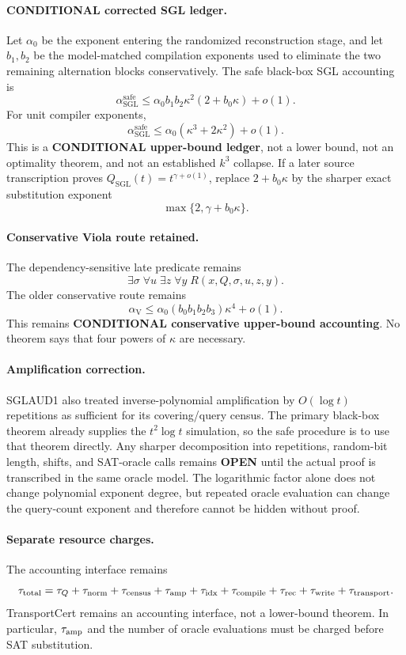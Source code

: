 \documentclass[11pt]{article}
\begin{document}
\paragraph{CONDITIONAL corrected SGL ledger.}
Let \(\alpha_0\) be the exponent entering the randomized reconstruction stage, and let \(b_1,b_2\) be the model-matched compilation exponents used to eliminate the two remaining alternation blocks conservatively. The safe black-box SGL accounting is
\[
\boxed{
\alpha_{\mathrm{SGL}}^{\mathrm{safe}}
\le
\alpha_0 b_1b_2\kappa^2(2+b_0\kappa)+o(1).
}
\]
For unit compiler exponents,
\[
\boxed{
\alpha_{\mathrm{SGL}}^{\mathrm{safe}}
\le
\alpha_0(\kappa^3+2\kappa^2)+o(1).
}
\]
This is a \textbf{CONDITIONAL upper-bound ledger}, not a lower bound, not an optimality theorem, and not an established \(k^3\) collapse. If a later source transcription proves \(Q_{\mathrm{SGL}}(t)=t^{\gamma+o(1)}\), replace \(2+b_0\kappa\) by the sharper exact substitution exponent
\[
\boxed{\max\{2,\gamma+b_0\kappa\}.}
\]

\paragraph{Conservative Viola route retained.}
The dependency-sensitive late predicate remains
\[
\boxed{
\exists\sigma\;\forall u\;\exists z\;\forall y\;R(x,Q,\sigma,u,z,y).
}
\]
The older conservative route remains
\[
\boxed{
\alpha_{\mathrm V}
\le
\alpha_0(b_0b_1b_2b_3)\kappa^4+o(1).
}
\]
This remains \textbf{CONDITIONAL conservative upper-bound accounting}. No theorem says that four powers of \(\kappa\) are necessary.

\paragraph{Amplification correction.}
SGLAUD1 also treated inverse-polynomial amplification by \(O(\log t)\) repetitions as sufficient for its covering/query census. The primary black-box theorem already supplies the \(t^2\log t\) simulation, so the safe procedure is to use that theorem directly. Any sharper decomposition into repetitions, random-bit length, shifts, and SAT-oracle calls remains \textbf{OPEN} until the actual proof is transcribed in the same oracle model. The logarithmic factor alone does not change polynomial exponent degree, but repeated oracle evaluation can change the query-count exponent and therefore cannot be hidden without proof.

\paragraph{Separate resource charges.}
The accounting interface remains
\[
\tau_{\rm total}=
\tau_Q+\tau_{\rm norm}+\tau_{\rm census}+\tau_{\rm amp}
+\tau_{\rm idx}+\tau_{\rm compile}+\tau_{\rm rec}
+\tau_{\rm write}+\tau_{\rm transport}.
\]
TransportCert remains an accounting interface, not a lower-bound theorem. In particular, \(\tau_{\rm amp}\) and the number of oracle evaluations must be charged before SAT substitution.
\end{document}
